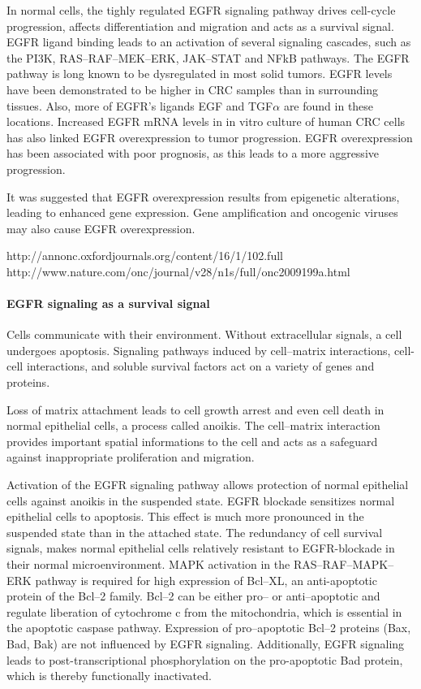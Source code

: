 {{{      In normal cells, the tighly regulated EGFR signaling pathway drives
      cell-cycle progression, affects differentiation and migration and  acts
      as a survival signal. EGFR ligand binding leads to an activation of
      several signaling cascades, such as the PI3K, RAS--RAF--MEK--ERK, JAK--STAT
      and NFkB pathways. The EGFR pathway is long known to be dysregulated
      in most solid tumors. EGFR levels have been demonstrated to be higher in
      CRC samples than in surrounding tissues. Also, more of EGFR's ligands EGF
      and TGF$\alpha$ are found in these locations. Increased EGFR mRNA levels
      in in vitro culture of human CRC cells  has also linked EGFR
      overexpression to tumor progression. EGFR overexpression has been
      associated with poor prognosis, as this leads to a more aggressive
      progression.

      It was suggested that EGFR overexpression results from epigenetic
      alterations, leading to enhanced gene expression. Gene amplification and
      oncogenic viruses may also cause EGFR overexpression.

      http://annonc.oxfordjournals.org/content/16/1/102.full
      http://www.nature.com/onc/journal/v28/n1s/full/onc2009199a.html

      \paragraph{EGFR signaling as a survival signal}

        Cells communicate with their environment. Without extracellular signals,
        a cell undergoes apoptosis. Signaling pathways induced by cell--matrix
        interactions, cell-cell interactions, and soluble survival factors act
        on a variety of genes and proteins.

        Loss of matrix attachment leads to cell growth arrest and even cell
        death in normal epithelial cells, a process called anoikis. The
        cell--matrix interaction provides important spatial informations to the
        cell and acts as a safeguard against inappropriate proliferation and
        migration.

        Activation of the EGFR signaling pathway allows protection of normal
        epithelial cells against anoikis in the suspended state. EGFR blockade
        sensitizes normal epithelial cells to apoptosis. This effect is much
        more pronounced in the suspended state than in the attached state. The
        redundancy of cell survival signals, makes normal epithelial cells
        relatively resistant to EGFR-blockade in their normal microenvironment.
        MAPK activation in the RAS--RAF--MAPK--ERK pathway is required for high
        expression of Bcl--XL, an anti-apoptotic protein of the Bcl--2 family.
        Bcl--2 can be either pro-- or anti--apoptotic and regulate liberation of
        cytochrome c from the mitochondria, which is essential in the apoptotic
        caspase pathway. Expression of pro--apoptotic Bcl--2 proteins (Bax, Bad,
        Bak) are not influenced by EGFR signaling. Additionally, EGFR signaling
        leads to post-transcriptional phosphorylation on the pro-apoptotic Bad
        protein, which is thereby functionally inactivated.

}}}
